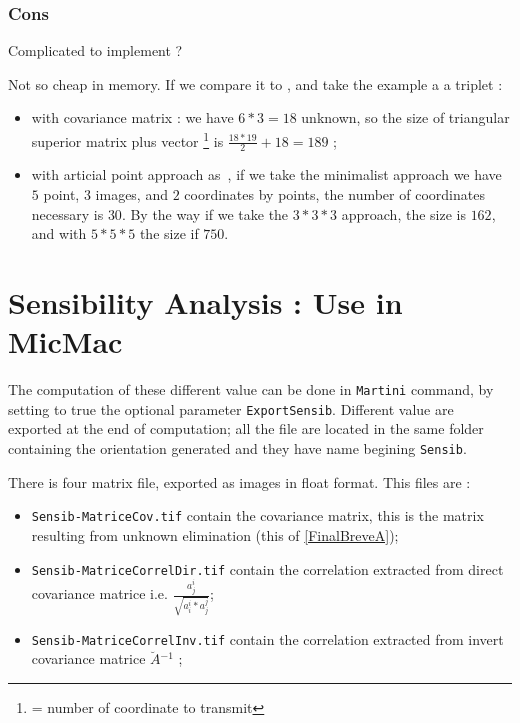 \subsubsection{Cons}

Complicated to implement ?

Not so cheap in memory. If we compare it to \cite{rupnik2020towards}, and take the example a a triplet :

\begin{itemize}
   \item with covariance matrix : we have $6*3=18$ unknown, so the size of triangular
        superior  matrix plus vector \footnote{= number of coordinate to transmit} is
         $\frac{18*19}{2} +18 = 189$ ;
         
   \item with articial point approach as~\cite{rupnik2020towards}, if we take the minimalist 
         approach we have $5$ point, $3$ images,
         and $2$ coordinates by points, the number of coordinates necessary is $30$. 
         By the way if we take the $3*3*3$ approach,
         the size is $162$, and with $5*5*5$ the size if $750$. 
\end{itemize}




\section{Sensibility Analysis : Use in MicMac}

The computation of these different value can be done in {\tt Martini} command,
by setting to true the optional parameter {\tt ExportSensib}. Different
value are exported at the end of computation; all the file are located
in the same folder containing the orientation generated and they  have name
begining  {\tt Sensib}.


There is four matrix file, exported as images in float format. This files
are : 

\begin{itemize}
     \item {\tt Sensib-MatriceCov.tif}  contain the covariance matrix,
           this is the matrix resulting from unknown elimination (this of \ref{FinalBreveA});

     \item {\tt Sensib-MatriceCorrelDir.tif}  contain the correlation extracted from
           direct covariance matrice i.e.  $ \frac{a^i_j}{\sqrt{a^i_i * a^j_j}}$;

     \item {\tt Sensib-MatriceCorrelInv.tif}  contain the correlation extracted from
           invert covariance matrice $\breve{A} {^{-1}}$  ;
\end{itemize}

